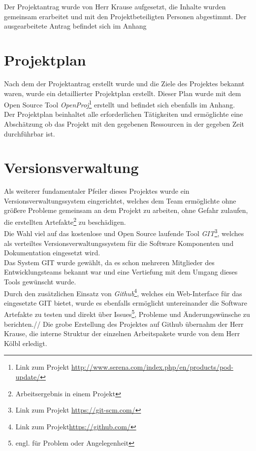 Der Projektantrag wurde von Herr Krause aufgesetzt, die Inhalte wurden gemeinsam erarbeitet und mit den Projektbeteiligten Personen abgestimmt. Der ausgearbeitete Antrag befindet sich im Anhang

\section{Projektplan}
Nach dem der Projektantrag erstellt wurde und die Ziele des Projektes bekannt waren, wurde ein detaillierter Projektplan erstellt. Dieser Plan wurde mit dem Open Source Tool \textit{OpenProj}\footnote{Link zum Projekt \url{http://www.serena.com/index.php/en/products/pod-update/}} erstellt und befindet sich ebenfalls im Anhang.\\
Der Projektplan beinhaltet alle erforderlichen Tätigkeiten und ermöglichte eine Abschätzung ob das Projekt mit den gegebenen Ressourcen in der gegeben Zeit durchführbar ist.

\section{Versionsverwaltung}
Als weiterer fundamentaler Pfeiler dieses Projektes wurde ein Versionsverwaltungssystem eingerichtet, welches dem Team ermöglichte ohne größere Probleme gemeinsam an dem Projekt zu arbeiten, ohne Gefahr zulaufen, die erstellten Artefakte\footnote{Arbeitsergebnis in einem Projekt} zu beschädigen.\\
Die Wahl viel auf das kostenlose und Open Source laufende Tool \textit{GIT}\footnote{Link zum Projekt \url{https://git-scm.com/}}, welches als verteiltes Versionsverwaltungssystem für die Software Komponenten und Dokumentation eingesetzt wird.\\
Das System GIT wurde gewählt, da es schon mehreren Mitglieder des Entwicklungsteams bekannt war und eine Vertiefung mit dem Umgang dieses Tools gewünscht wurde.\\
Durch den zusätzlichen Einsatz von \textit{Github}\footnote{Link zum Projekt\url{https://github.com/}}, welches ein Web-Interface für das eingesetzte GIT bietet, wurde es ebenfalls ermöglicht untereinander die Software Artefakte zu testen und direkt über Issues\footnote{engl. für Problem oder Angelegenheit}, Probleme und Änderungswünsche zu berichten.//
Die grobe Erstellung des Projektes auf Github übernahm der Herr Krause, die interne Struktur der einzelnen Arbeitspakete wurde von dem Herr Kölbl erledigt. 


